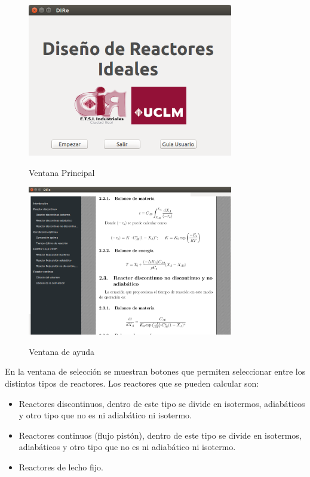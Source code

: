 	\begin{figure}[!h]
		\centering
		\includegraphics[width=0.8\textwidth]{./imagenes/DIRe_051.png}
		\label{vent_prin}
		\caption{Ventana Principal}
	\end{figure}
	
	\begin{figure}[!h]
		\centering
		\includegraphics[width=0.8\textwidth]{./imagenes/DIRe_050.png}
		\label{vent_ayuda}
		\caption{Ventana de ayuda}
	\end{figure}

	En la ventana de selección se muestran botones que permiten seleccionar entre los distintos tipos de reactores. Los reactores que se pueden calcular son:
	
	\begin{itemize}
		\item Reactores discontinuos, dentro de este tipo se divide en isotermos, adiabáticos y otro tipo que no es ni adiabático ni isotermo.
		\item Reactores continuos (flujo pistón), dentro de este tipo se divide en isotermos, adiabáticos y otro tipo que no es ni adiabático ni isotermo.
		\item Reactores de lecho fijo.
	\end{itemize}


